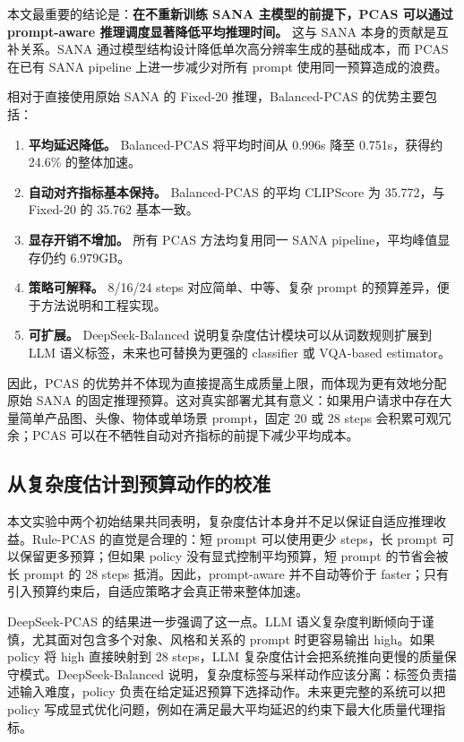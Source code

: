 \documentclass[UTF8,zihao=-4,fontset=fandol]{ctexart}
\newcommand{\clipscore}{\textrm{CLIPScore}}
\begin{document}
本文最重要的结论是：\textbf{在不重新训练 SANA 主模型的前提下，PCAS 可以通过 prompt-aware 推理调度显著降低平均推理时间。} 这与 SANA 本身的贡献是互补关系。SANA 通过模型结构设计降低单次高分辨率生成的基础成本，而 PCAS 在已有 SANA pipeline 上进一步减少对所有 prompt 使用同一预算造成的浪费。

相对于直接使用原始 SANA 的 Fixed-20 推理，Balanced-PCAS 的优势主要包括：
\begin{enumerate}
  \item \textbf{平均延迟降低。} Balanced-PCAS 将平均时间从 0.996s 降至 0.751s，获得约 24.6\% 的整体加速。
  \item \textbf{自动对齐指标基本保持。} Balanced-PCAS 的平均 \clipscore{} 为 35.772，与 Fixed-20 的 35.762 基本一致。
  \item \textbf{显存开销不增加。} 所有 PCAS 方法均复用同一 SANA pipeline，平均峰值显存仍约 6.979GB。
  \item \textbf{策略可解释。} 8/16/24 steps 对应简单、中等、复杂 prompt 的预算差异，便于方法说明和工程实现。
  \item \textbf{可扩展。} DeepSeek-Balanced 说明复杂度估计模块可以从词数规则扩展到 LLM 语义标签，未来也可替换为更强的 classifier 或 VQA-based estimator。
\end{enumerate}

因此，PCAS 的优势并不体现为直接提高生成质量上限，而体现为更有效地分配原始 SANA 的固定推理预算。这对真实部署尤其有意义：如果用户请求中存在大量简单产品图、头像、物体或单场景 prompt，固定 20 或 28 steps 会积累可观冗余；PCAS 可以在不牺牲自动对齐指标的前提下减少平均成本。

\subsection{从复杂度估计到预算动作的校准}

本文实验中两个初始结果共同表明，复杂度估计本身并不足以保证自适应推理收益。Rule-PCAS 的直觉是合理的：短 prompt 可以使用更少 steps，长 prompt 可以保留更多预算；但如果 policy 没有显式控制平均预算，短 prompt 的节省会被长 prompt 的 28 steps 抵消。因此，prompt-aware 并不自动等价于 faster；只有引入预算约束后，自适应策略才会真正带来整体加速。

DeepSeek-PCAS 的结果进一步强调了这一点。LLM 语义复杂度判断倾向于谨慎，尤其面对包含多个对象、风格和关系的 prompt 时更容易输出 high。如果 policy 将 high 直接映射到 28 steps，LLM 复杂度估计会把系统推向更慢的质量保守模式。DeepSeek-Balanced 说明，复杂度标签与采样动作应该分离：标签负责描述输入难度，policy 负责在给定延迟预算下选择动作。未来更完整的系统可以把 policy 写成显式优化问题，例如在满足最大平均延迟的约束下最大化质量代理指标。
\end{document}
